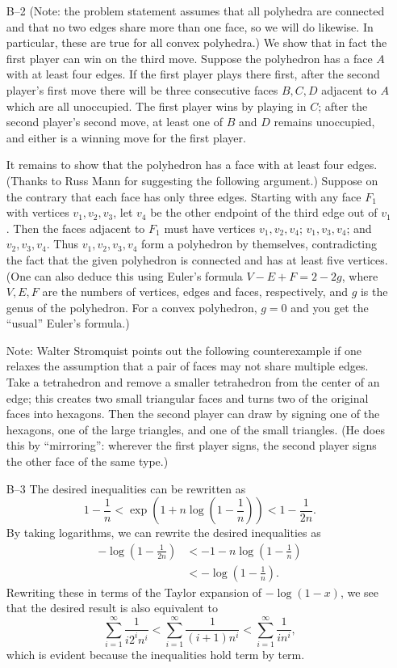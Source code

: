 \documentclass[amssymb,twocolumn,pra,10pt,aps]{revtex4-1}
\begin{document}
\begin{itemize}
\item[B--2]
(Note: the problem statement assumes that all polyhedra are connected
and that no two edges share more than one face,
so we will do likewise. In particular, these are true for all convex
polyhedra.)
We show that in fact the first player can win on the third move.
Suppose the polyhedron has a face $A$ with at least four edges. If
the first player plays there first, after the second player's first move
there will be three consecutive faces $B,C,D$ adjacent to $A$ which
are all unoccupied. The first player wins by playing in $C$; after
the second player's second move, at least one of $B$ and $D$ remains
unoccupied, and either is a winning move for the first player.

It remains to show that the polyhedron has a face with at least four
edges. (Thanks to Russ Mann for suggesting the following argument.)
Suppose on the contrary that each face has only three edges.
Starting with any face $F_1$ with vertices $v_1, v_2, v_3$, let
$v_4$ be the other endpoint of the third edge out of $v_1$. Then
the faces adjacent to $F_1$ must have vertices $v_1, v_2, v_4$;
$v_1, v_3, v_4$; and $v_2, v_3, v_4$. Thus $v_1, v_2, v_3, v_4$ form
a polyhedron by themselves, contradicting the fact that the given
polyhedron is connected and has at least five vertices.
(One can also deduce this using Euler's formula
$V - E + F = 2 - 2g$, where $V,E,F$ are the numbers of vertices,
edges and faces, respectively, and $g$ is the genus of the polyhedron.
For a convex polyhedron, $g=0$ and you get the ``usual'' Euler's formula.)

Note: Walter Stromquist points out the following counterexample if
one relaxes the assumption that a pair of faces may not share multiple
edges. Take a tetrahedron and remove a smaller tetrahedron from the
center of an edge; this creates two small triangular faces and turns two
of the original faces into hexagons. Then the second player can draw
by signing one of the hexagons, one of the large triangles, and one
of the small triangles. (He does this by ``mirroring'': wherever the first
player signs, the second player signs the other face of the same type.)

\item[B--3]
The desired inequalities can be rewritten as
\[
1 - \frac{1}{n} < \exp\left( 1 + n \log \left( 1 - \frac{1}{n} \right)
\right) < 1 - \frac{1}{2n}.
\]
By taking logarithms, we can rewrite the desired inequalities as
\begin{align*}
-\log \left( 1 - \frac{1}{2n} \right)
&< -1 - n \log \left( 1 - \frac{1}{n} \right) \\
&< -\log \left( 1 - \frac{1}{n} \right).
\end{align*}
Rewriting these in terms of the Taylor expansion of
$-\log(1-x)$, we see that the desired result is also equivalent
to
\[
\sum_{i=1}^\infty \frac{1}{i 2^i n^i}
< \sum_{i=1}^\infty \frac{1}{(i+1) n^i}
< \sum_{i=1}^\infty \frac{1}{i n^i},
\]
which is evident because the inequalities hold term by term.


\end{itemize}
\end{document}
